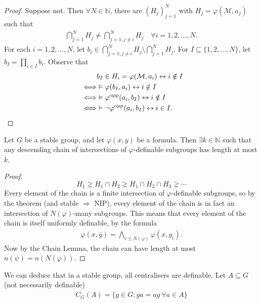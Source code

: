 \documentclass{article}
\let\models\vDash
\begin{document}
\begin{proof}
  Suppose not.
  Then $\forall N \in \mathbb{N}$, there are $(H_j)_{j=1}^N$ with $H_j = \varphi(\mathcal{M},a_j)$ such that
  \begin{align*}
    \bigcap_{j=1}^N H_j \neq \bigcap_{j=1, j \neq i}^N H_j \quad \forall i = 1,2,\dotsc,N.
  \end{align*}
  For each $i =1, 2,\dotsc, N$, let $b_i \in \bigcap_{j=1,j\neq i}^N H_j \setminus \bigcap_{j=1}^N H_j$.
  For $I \subseteq \{1,2,\dotsc,N\}$, let $b_I = \prod_{i \in I} b_i$.
  Observe that
  \begin{align*}
    &\phantom{\iff}b_I \in H_i = \varphi(\mathcal{M},a_i) \leftrightarrow i \notin I \\
    &\iff \models \varphi(b_I, a_i) \leftrightarrow i \notin I \\
    &\iff \models \varphi^{\text{opp}}(a_i, b_I) \leftrightarrow i \notin I \\
    &\iff \models \neg\varphi^{\text{opp}}(a_i, b_I) \leftrightarrow i \in I. \qedhere
  \end{align*}
\end{proof}
\begin{cor}
  Let $G$ be a stable group, and let $\varphi(x,y)$ be a formula. Then $\exists k \in \mathbb{N}$ such that any descending chain of intersections of $\varphi$-definable subgroups has length at most $k$.
\end{cor}
\begin{proof}
  \begin{equation*}
    H_1 \gneq H_1 \cap H_2 \gneq H_1 \cap H_2 \cap H_3 \gneq \dotsb
  \end{equation*}
  Every element of the chain is a finite intersection of $\varphi$-definable subgroups, so by the theorem (and stable $\Rightarrow$ NIP), every element of the chain is in fact an intersection of $N(\varphi)$-many subgroups.
  This means that every element of the chain is itself uniformly definable, by the formula
  \begin{align*}
    \varphi(x,\bar{y}) = \bigwedge_{i \leq N(\varphi)} \varphi(x,y_i).
  \end{align*}
  Now by the Chain Lemma, the chain can have length at most $n(\psi) = n(N(\varphi))$.
\end{proof}
We can deduce that in a stable group, all centralisers are definable.
Let $A \subseteq G$ (not necessarily definable)
\begin{align*}
  C_G(A) = \{g \in G : g a = a g\ \forall a \in A\}
\end{align*}
\end{document}
